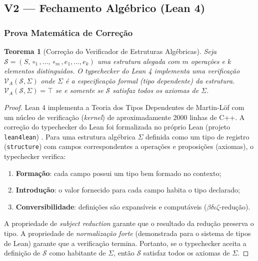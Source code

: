 \documentclass[5p]{elsarticle}
\newtheorem{theorem}{Teorema}[section]
\theoremstyle{remark}
\begin{document}
\subsection{V2 --- Fechamento Algébrico (Lean 4)}

\subsubsection{Prova Matemática de Correção}

\begin{theorem}[Correção do Verificador de Estruturas Algébricas]
Seja $\mathcal{S} = (S, \circ_1, \ldots, \circ_m, e_1, \ldots, e_k)$ uma estrutura alegada com $m$ operações e $k$ elementos distinguidos. O typechecker do Lean 4 implementa uma verificação $\mathcal{V}_A(\mathcal{S}, \Sigma)$ onde $\Sigma$ é a especificação formal (tipo dependente) da estrutura. $\mathcal{V}_A(\mathcal{S}, \Sigma) = \top$ se e somente se $\mathcal{S}$ satisfaz todos os axiomas de $\Sigma$.
\end{theorem}

\begin{proof}
Lean 4 implementa a Teoria dos Tipos Dependentes de Martin-Löf com um núcleo de verificação (\textit{kernel}) de aproximadamente 2000 linhas de C++. A correção do typechecker do Lean foi formalizada no próprio Lean (projeto \texttt{lean4lean}) \cite{Carneiro2024Lean}. Para uma estrutura algébrica $\Sigma$ definida como um tipo de registro (\texttt{structure}) com campos correspondentes a operações e proposições (axiomas), o typechecker verifica:

\begin{enumerate}[label=(\roman*)]
    \item \textbf{Formação}: cada campo possui um tipo bem formado no contexto;
    \item \textbf{Introdução}: o valor fornecido para cada campo habita o tipo declarado;
    \item \textbf{Conversibilidade}: definições são expansíveis e computáveis ($\beta\delta\iota\zeta$-redução).
\end{enumerate}

A propriedade de \textit{subject reduction} garante que o resultado da redução preserva o tipo. A propriedade de \textit{normalização forte} (demonstrada para o sistema de tipos de Lean) garante que a verificação termina. Portanto, se o typechecker aceita a definição de $\mathcal{S}$ como habitante de $\Sigma$, então $\mathcal{S}$ satisfaz todos os axiomas de $\Sigma$.
\end{proof}
\end{document}
